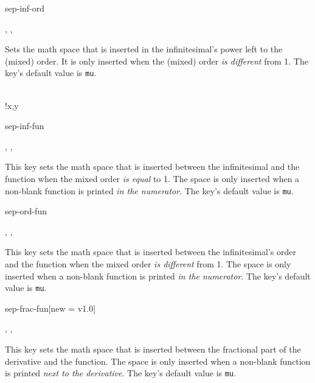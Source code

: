 \clearpage

\begin{option}{sep-inf-ord}
	\begin{values}[default = 0]
		, , 
	\end{values}
	Sets the math space that is inserted in the infinitesimal's power left to the (mixed) order. It is only inserted when the (mixed) order \emph{is different} from \num{1}. The key's default value is  \texttt{mu}.
	\begin{example}
		 \\
		!{x,y}
	\end{example}
\end{option}

\begin{option}{sep-inf-fun}
	\begin{values}[default = 0]
		, , \marg{delimiter}
	\end{values}
	This key sets the math space that is inserted between the infinitesimal and the function when the mixed order \emph{is equal} to \num{1}. The space is only inserted when a non-blank function is printed \emph{in the numerator}. The key's default value is  \texttt{mu}.
	\begin{example}
		\pdv[sep-inf-fun=\here]{f}{x}
	\end{example}
\end{option}

\begin{option}{sep-ord-fun}
	\begin{values}[default = 0]
		, , 
	\end{values}
	This key sets the math space that is inserted between the infinitesimal's order and the function when the mixed order \emph{is different} from \num{1}. The space is only inserted when a non-blank function is printed \emph{in the numerator}. The key's default value is  \texttt{mu}.
	\begin{example}
		\pdv[sep-ord-fun=\here]{f}{x,y}
	\end{example}
\end{option}

\begin{option}{sep-frac-fun}[new = v1.0]
	\begin{values}[default = 0]
		, , 
	\end{values}
	This key sets the math space that is inserted between the fractional part of the derivative and the function. The space is only inserted when a non-blank function is printed \emph{next to the derivative}. The key's default value is  \texttt{mu}.
	\begin{example}
		\pdv*[sep-frac-fun=\here]{f}{x,y}
	\end{example}
\end{option}

